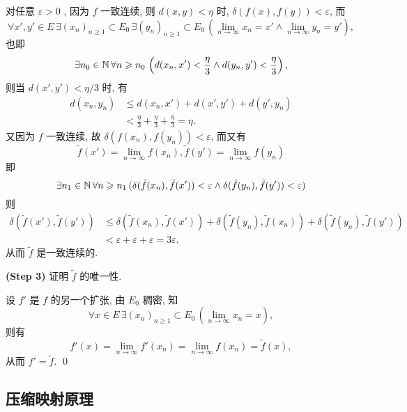 \begin{Proof}
          对任意 $ \varepsilon>0 $ , 因为 $ f $ 一致连续, 则 $ d(x, y)<\eta $ 时, $ \delta(f(x), f(y))<\varepsilon $, 而 
          \[
               \forall x', y'\in E\,\exists  (x_{n})_{n\geqslant1}\subset E_{0} \,\exists  (y_{n})_{n\geqslant1}\subset E_{0} \,(\lim_{n\to\infty}x_{n}=x'\land \lim_{n\to\infty}y_{n}=y' ), 
          \]  
          也即 
          \[
               \exists n_{0}\in\mathbb{N}\,\forall n\geqslant n_{0}\,\left(d(x_{n}, x')<\frac{\eta}{3}\land d(y_{n}, y')<\frac{\eta}{3}\right), 
          \] 
          则当 $ d(x', y')<\eta/3 $ 时, 有
          \[
               \begin{aligned}
                    d(x_{n}, y_{n}) & \leqslant d(x_{n}, x')+d(x', y')+d(y', y_{n})\\
                    & < \frac{\eta}{3}+\frac{\eta}{3}+\frac{\eta}{3}=\eta.
               \end{aligned}
          \]
          又因为 $ f $ 一致连续, 故 $ \delta(f(x_{n}), f(y_{n}))<\varepsilon $, 而又有
          \[
               \tilde{f}(x')=\lim_{n\to\infty}f(x_{n}), \tilde{f}(y')=\lim_{n\to\infty}f(y_{n})
          \]
          即
          \[
               \exists n_{1}\in\mathbb{N}\,\forall n\geqslant n_{1}\,(\delta(\tilde{f}(x_{n}), \tilde{f}(x'))<\varepsilon\land \delta(\tilde{f}(y_{n}), \tilde{f}(y'))<\varepsilon)
          \]
          则
          \[
               \begin{aligned}
                    \delta(\tilde{f}(x'), \tilde{f}(y')) & \leqslant \delta(\tilde{f}(x_{n}), \tilde{f}(x'))+\delta(\tilde{f}(y_{n}), \tilde{f}(x_{n}))+\delta(\tilde{f}(y_{n}), \tilde{f}(y'))\\
                    & <\varepsilon+\varepsilon+\varepsilon=3\varepsilon. 
               \end{aligned}
          \]
          从而 $ \tilde{f} $ 是一致连续的. 

          \textbf{(Step 3)} 证明 $ \tilde{f} $ 的唯一性. 

          
          设 $ {f}' $ 是 $ f $ 的另一个扩张, 由 $ E_{0} $ 稠密, 知
          \[
               \forall x\in E\,\exists (x_{n})_{n\geqslant1} \subset E_{0}\,(\lim_{n\to\infty}x_{n}=x),
          \]
          则有
          \[
               f'(x)=\lim_{n\to\infty}f'(x_{n})=\lim_{n\to\infty}f(x_{n})=\tilde{f}(x), 
          \]
          从而 $ f'=\tilde{f} $. \qed
     \end{Proof}

     \subsection{压缩映射原理}


